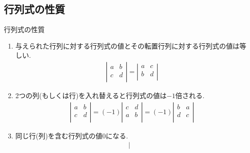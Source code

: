 \documentclass[a4paper]{jsarticle}
\begin{document}
\subsection{行列式の性質}
\begin{itembox}[l]{行列式の性質}
    \begin{enumerate}[(1)]
        \item 与えられた行列に対する行列式の値とその転置行列に対する行列式の値は等しい.
              \begin{eqnarray*}
                  \left| \begin{array}{rr}
                      a & b \\
                      c & d \\
                  \end{array} \right|
                  =
                  \left| \begin{array}{rr}
                      a & c \\
                      b & d \\
                  \end{array} \right|
              \end{eqnarray*}
        \item 2つの列(もしくは行)を入れ替えると行列式の値は$-1$倍される.
              \begin{eqnarray*}
                  \left| \begin{array}{rr}
                      a & b \\
                      c & d \\
                  \end{array} \right|
                  =(-1)
                  \left| \begin{array}{rr}
                      c & d \\
                      a & b \\
                  \end{array} \right|
                  =(-1)
                  \left| \begin{array}{rr}
                      b & a \\
                      d & c \\
                  \end{array} \right|
              \end{eqnarray*}
        \item 同じ行(列)を含む行列式の値$0$になる.
              \begin{eqnarray*}
                  \left| \begin{array}{rr}

\end{array}
\end{eqnarray*}
\end{enumerate}
\end{itembox}
\end{document}
